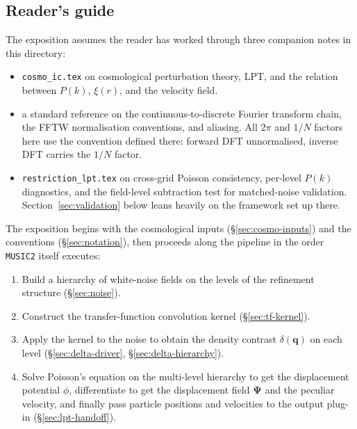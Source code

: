 \documentclass[12pt]{article}
\newcommand{\bq}{\mathbf{q}}
\begin{document}
\subsection{Reader's guide}

The exposition assumes the reader has worked through three companion
notes in this directory:

\begin{itemize}
  \item \texttt{cosmo\_ic.tex} on cosmological perturbation theory,
        LPT, and the relation between $P(k)$, $\xi(r)$, and the
        velocity field.
  \item a standard reference on the continuous-to-discrete Fourier transform
        chain, the FFTW normalisation conventions, and aliasing.
        All $2\pi$ and $1/N$ factors here use the convention defined
        there: forward DFT unnormalised, inverse DFT carries the
        $1/N$ factor.
  \item \texttt{restriction\_lpt.tex} on cross-grid Poisson consistency,
        per-level $P(k)$ diagnostics, and the field-level subtraction
        test for matched-noise validation.  Section~\ref{sec:validation}
        below leans heavily on the framework set up there.
\end{itemize}

The exposition begins with the cosmological inputs
(\S\ref{sec:cosmo-inputs}) and the conventions (\S\ref{sec:notation}),
then proceeds along the pipeline in the order \texttt{MUSIC2} itself
executes:

\begin{enumerate}
  \item Build a hierarchy of white-noise fields on the levels of the
        refinement structure (\S\ref{sec:noise}).
  \item Construct the transfer-function convolution kernel
        (\S\ref{sec:tf-kernel}).
  \item Apply the kernel to the noise to obtain the density contrast
        $\delta(\bq)$ on each level (\S\ref{sec:delta-driver},
        \S\ref{sec:delta-hierarchy}).
  \item Solve Poisson's equation on the multi-level hierarchy to get
        the displacement potential $\phi$, differentiate to get the
        displacement field $\boldsymbol\Psi$ and the peculiar velocity,
        and finally pass particle positions and velocities to the
        output plug-in (\S\ref{sec:lpt-handoff}).
\end{enumerate}
\end{document}
